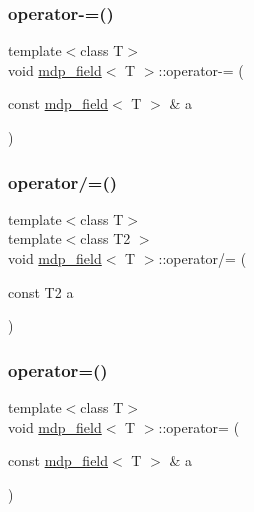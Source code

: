 \mbox{\label{classmdp__field_a84b91b09eff5b553ea69bbcb0da9fbd4}} 
\subsubsection{\texorpdfstring{operator-\/=()}{operator-=()}}
{\footnotesize\ttfamily template$<$class T$>$ \\
void \hyperlink{classmdp__field}{mdp\+\_\+field}$<$ T $>$\+::operator-\/= (\begin{DoxyParamCaption}\item[{const \hyperlink{classmdp__field}{mdp\+\_\+field}$<$ T $>$ \&}]{a }\end{DoxyParamCaption})\hspace{0.3cm}{\ttfamily [inline]}}

\mbox{\label{classmdp__field_a0ffc4ca9d566ea62c81f703d5e3ccfbf}} 
\subsubsection{\texorpdfstring{operator/=()}{operator/=()}}
{\footnotesize\ttfamily template$<$class T$>$ \\
template$<$class T2 $>$ \\
void \hyperlink{classmdp__field}{mdp\+\_\+field}$<$ T $>$\+::operator/= (\begin{DoxyParamCaption}\item[{const T2}]{a }\end{DoxyParamCaption})\hspace{0.3cm}{\ttfamily [inline]}}

\mbox{\label{classmdp__field_a3fd348984e7f37a5d85e18bb12212017}} 
\subsubsection{\texorpdfstring{operator=()}{operator=()}\hspace{0.1cm}{\footnotesize\ttfamily [1/2]}}
{\footnotesize\ttfamily template$<$class T$>$ \\
void \hyperlink{classmdp__field}{mdp\+\_\+field}$<$ T $>$\+::operator= (\begin{DoxyParamCaption}\item[{const \hyperlink{classmdp__field}{mdp\+\_\+field}$<$ T $>$ \&}]{a }\end{DoxyParamCaption})\hspace{0.3cm}{\ttfamily [inline]}}

